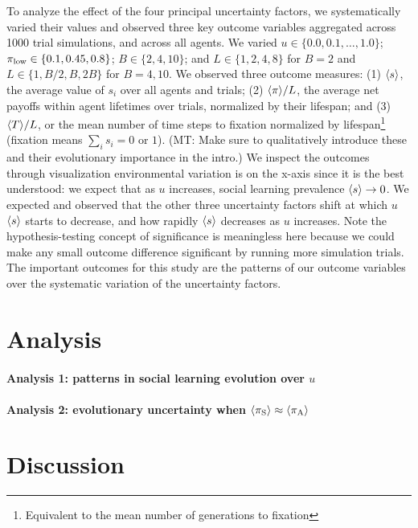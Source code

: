 \documentclass[letterpaper,11.5pt]{scrartcl}
\newcommand{\mt}[1]{{\textcolor{myorange} {({\tiny MT:} #1)}}}
\begin{document}
To analyze the effect of the four principal uncertainty factors, we systematically
varied their values and observed three key outcome variables aggregated across 1000
trial simulations, and across all agents. We varied $u \in \{0.0,
0.1, \ldots, 1.0\}$; $\pi_{\mathrm{low}} \in \{0.1, 0.45, 0.8\}$; $B \in \{2, 4, 10\}$; and $L
\in \{1,2,4,8\}$ for $B=2$ and $L \in \{1,B/2,B,2B\}$ for $B=4,10$.  We observed
three outcome measures: (1) $\langle s \rangle$, the average value of $s_i$ over all agents
and trials; (2) $\langle \pi \rangle / L$, the average net payoffs within agent lifetimes over
trials, normalized by their lifespan; and (3) $\langle T \rangle / L$, or the mean number
of time steps to fixation normalized by lifespan\footnote{Equivalent to the mean
number of generations to fixation} 
(fixation means $\sum_i s_i = 0 \text{ or } 1$). \mt{Make sure to qualitatively
introduce these and their evolutionary importance in the intro.}
We inspect the outcomes through visualization environmental
variation is on the x-axis since it is the best understood: we expect that as $u$
increases, social learning prevalence $\langle s \rangle \to 0$. We expected and observed
that the other three uncertainty factors shift at which $u$ $\langle s \rangle$ starts to
decrease, and how rapidly $\langle s \rangle$ decreases as $u$ increases. Note the
hypothesis-testing concept of significance is meaningless here because we could
make any small outcome difference significant by running more simulation trials.
The important outcomes for this study are the patterns of our outcome 
variables over the systematic variation of the uncertainty factors.

\section{Analysis}

\paragraph{Analysis 1: patterns in social learning evolution over $u$}

\paragraph{Analysis 2: evolutionary uncertainty when $\langle \pi_\mathrm{S} \rangle \approx \langle \pi_\mathrm{A} \rangle$}

\section{Discussion}
\end{document}
